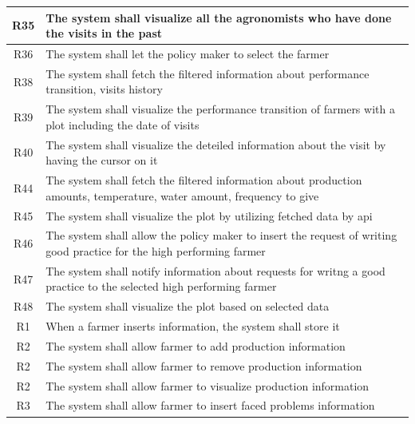\begin{center}
\begin{longtable}{|c|m{}|}
            \hline
            \textsc{R35}  &    The system shall visualize all the agronomists who have done the visits in the past \\
            \hline
            \textsc{R36}  &    The system shall let the policy maker to select the farmer  \\
            \hline
            \textsc{R38}  &    The system shall fetch the filtered information about performance transition, visits history  \\
            \hline
            \textsc{R39}  &    The system shall visualize the performance transition of farmers with a plot including the date of visits  \\
            \hline
            \textsc{R40}  &    The system shall visualize the deteiled information about the visit by having  the cursor on it  \\
            \hline
            \textsc{R44}  &    The system shall fetch the filtered information about production amounts, temperature, water amount, frequency to give  \\
            \hline
            \textsc{R45}  &    The system shall visualize the plot by utilizing fetched data by api  \\
            \hline
            \textsc{R46}  &    The system shall allow the policy maker to insert the request of writing good practice for the high performing farmer  \\
            \hline
            \textsc{R47}  &    The system shall notify information about requests for writng a good practice to the selected high performing farmer  \\
            \hline
            \textsc{R48}  &    The system shall visualize the plot based on selected data  \\
            \hline
            \hline
            \hline
            \textsc{R1}  &    When a farmer inserts information, the system shall store it  \\
            \hline
            \textsc{R2}  &    The system shall allow farmer to add production information  \\
            \textsc{R2}  &    The system shall allow farmer to remove production information  \\
            \textsc{R2}  &    The system shall allow farmer to visualize production information  \\
            \hline
            \textsc{R3}  &    The system shall allow farmer to insert faced problems information  \\

\end{longtable}
\end{center}

